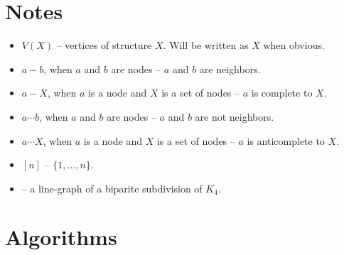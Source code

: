 

\author{Adrian Siwiec}
\date{\today{}}


\section{Notes}
\begin{itemize}
	\item $V(X)$ -- vertices of structure $X$. Will be written as $X$ when obvious.
	\item $a - b$, when $a$ and $b$ are nodes -- $a$ and $b$ are neighbors.
	\item $a - X$, when $a$ is a node and $X$ is a set of nodes -- $a$ is complete to $X$.
	\item $a \cdots b$, when $a$ and $b$ are nodes -- $a$ and $b$ are not neighbors.
	\item $a \cdots X$, when $a$ is a node and $X$ is a set of nodes -- $a$ is anticomplete to $X$.
	\item $[n]$  -- $\{1, \ldots, n\}$.
	\item \LGBSK -- a line-graph of a biparite subdivision of $K_4$.
\end{itemize}
	
\section{Algorithms}
\begin{algorithm}
\end{algorithm}
  

	


	

